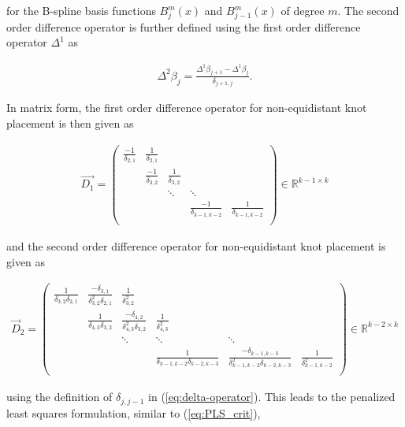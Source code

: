 \documentclass[10pt,a4paper]{report}
\begin{document}
for the B-spline basis functions $B_j^m(x)$ and $B_{j-1}^m(x)$ of degree $m$. 
The second order difference operator is further defined using the first order difference operator $\Delta^1$ as 

\begin{align} \label{eq:d2-operator-nonequidistant}
	\Delta^2 \beta_j = \frac{\Delta^1 \beta_{j+1} - \Delta^1 \beta_j}{\delta_{j+1,j}}.
\end{align}

In matrix form, the first order difference operator for non-equidistant knot placement is then given as

\begin{align} \label{eq:d1-matrix-nonequidistant}
	\vec{D_1} = \begin{pmatrix}
					\frac{-1}{\delta_{2,1}} & \frac{1}{\delta_{2,1}} &                         &  \\
										   & \frac{-1}{\delta_{3,2}} & \frac{1}{\delta_{3,2}} & \\
										   & 				        & 	\ddots                 & \ddots \\
										   &                        &                         & \frac{-1}{\delta_{k-1, k-2}} & \frac{1}{\delta_{k-1, k-2}} \\ 
	\end{pmatrix} \in \mathbb{R}^{k-1 \times k}
\end{align} 

and the second order difference operator for non-equidistant knot placement is given as

\begin{align} \label{eq:d2-matrix-nonequidistant}
	\vec{D}_2 = \begin{pmatrix}
\frac{1}{\delta_{3,2} \delta_{2,1}} & \frac{- \delta_{3,1}}{\delta_{3,2}^2 \delta_{2,1}} & \frac{1}{\delta_{3,2}^2}  &  \\
									& \frac{1}{\delta_{4,3} \delta_{3,2}} & \frac{- \delta_{4,2}}{\delta_{4,3}^2 \delta_{3,2}} & \frac{1}{\delta_{4,3}^2} \\
									&       & 	\ddots    & \ddots & \ddots \\
		&    &  & \frac{1}{\delta_{k-1, k-2} \delta_{k-2, k-3}} & \frac{-\delta_{k-1, k-3}}{\delta_{k-1, k-2}^2 \delta_{k-2, k-3}} & \frac{1}{\delta_{k-1, k-2}^2} \\ 
	\end{pmatrix} \in \mathbb{R}^{k-2 \times k}
\end{align}

using the definition of $\delta_{j, j-1}$ in (\ref{eq:delta-operator}). This leads to the penalized least squares formulation, similar to (\ref{eq:PLS_crit}),
\end{document}
